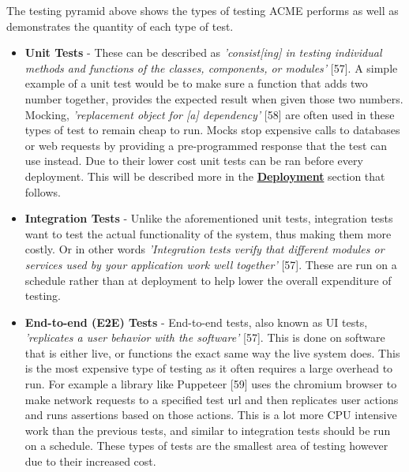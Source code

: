   The testing pyramid above shows the types of testing ACME performs as well as demonstrates the quantity of each type of test.
  \begin{itemize}
    \item \textbf{Unit Tests} - These can be described as \textit{'consist[ing] in testing individual methods and functions of the classes, components, 
    or modules'} [57]. A simple example of a unit test would be to make sure a function that adds two number together, provides the expected result
    when given those two numbers. Mocking, \textit{'replacement object for [a] dependency'} [58] are often used in these types of test to remain cheap
    to run. Mocks stop expensive calls to databases or web requests by providing a pre-programmed response that the test can use instead. Due to their 
    lower cost unit tests can be ran before every deployment. This will be described more in the \hyperref[sec:Deployment]{\textbf{Deployment}} 
    section that follows.

    \item \textbf{Integration Tests} - Unlike the aforementioned unit tests, integration tests want to test the actual functionality of the system, thus 
    making them more costly. Or in other words \textit{'Integration tests verify that different modules or services used by your application work well
    together'} [57]. These are run on a schedule rather than at deployment to help lower the overall expenditure of testing. 
  
    \item \textbf{End-to-end (E2E) Tests} - End-to-end tests, also known as UI tests, \textit{'replicates a user behavior with the software'} [57].
    This is done on software that is either live, or functions the exact same way the live system does. This is the most expensive type of testing as
    it often requires a large overhead to run. For example a library like Puppeteer [59] uses the chromium browser to make network requests to a 
    specified test url and then replicates user actions and runs assertions based on those actions. This is a lot more CPU intensive work than the 
    previous tests, and similar to integration tests should be run on a schedule. These types of tests are the smallest area of testing however due 
    to their increased cost.
  \end{itemize}

